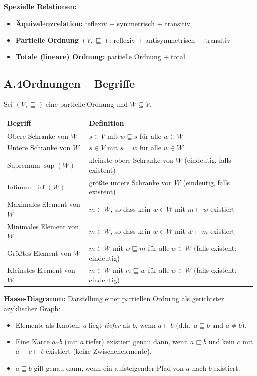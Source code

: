 \medskip
\noindent\textbf{Spezielle Relationen:}
\begin{itemize}
  \item \textbf{Äquivalenzrelation:} reflexiv $+$ symmetrisch $+$ transitiv
  \item \textbf{Partielle Ordnung} $(V,\sqsubseteq)$: reflexiv $+$ antisymmetrisch $+$ transitiv
  \item \textbf{Totale (lineare) Ordnung:} partielle Ordnung $+$ total
\end{itemize}

\subsection*{A.4\quad Ordnungen -- Begriffe}

Sei $(V, \sqsubseteq)$ eine partielle Ordnung und $W \subseteq V$.

\medskip
\begin{center}
\renewcommand{\arraystretch}{1.6}
\begin{tabularx}{\textwidth}{l X}
\textbf{Begriff} & \textbf{Definition} \\
\hline
Obere Schranke von $W$ & $s \in V$ mit $w \sqsubseteq s$ für alle $w \in W$ \\
Untere Schranke von $W$ & $s \in V$ mit $s \sqsubseteq w$ für alle $w \in W$ \\
Supremum $\sup(W)$ & kleinste obere Schranke von $W$ (eindeutig, falls existent) \\
Infimum $\inf(W)$ & größte untere Schranke von $W$ (eindeutig, falls existent) \\
Maximales Element von $W$ & $m \in W$, so dass kein $w \in W$ mit $m \sqsubset w$ existiert \\
Minimales Element von $W$ & $m \in W$, so dass kein $w \in W$ mit $w \sqsubset m$ existiert \\
Größtes Element von $W$ & $m \in W$ mit $w \sqsubseteq m$ für alle $w \in W$ (falls existent: eindeutig) \\
Kleinstes Element von $W$ & $m \in W$ mit $m \sqsubseteq w$ für alle $w \in W$ (falls existent: eindeutig) \\
\end{tabularx}
\end{center}

\medskip
\noindent\textbf{Hasse-Diagramm:} Darstellung einer partiellen Ordnung als gerichteter azyklischer Graph:
\begin{itemize}
  \item Elemente als Knoten; $a$ liegt \emph{tiefer} als $b$, wenn $a \sqsubset b$ (d.h.\ $a \sqsubseteq b$ und $a \neq b$).
  \item Eine Kante $a$--$b$ (mit $a$ tiefer) existiert genau dann, wenn $a \sqsubset b$ und kein $c$ mit $a \sqsubset c \sqsubset b$ existiert (keine Zwischenelemente).
  \item $a \sqsubseteq b$ gilt genau dann, wenn ein aufsteigender Pfad von $a$ nach $b$ existiert.
\end{itemize}

